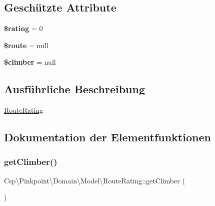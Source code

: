 \subsection*{Geschützte Attribute}
\begin{DoxyCompactItemize}
\item 
\mbox{\label{classCsp_1_1Pinkpoint_1_1Domain_1_1Model_1_1RouteRating_a0f692a13c1bb248af461abf897391aff}} 
{\bfseries \$rating} = 0
\item 
\mbox{\label{classCsp_1_1Pinkpoint_1_1Domain_1_1Model_1_1RouteRating_ae922a14157d205d824ad88dba43e33d6}} 
{\bfseries \$route} = null
\item 
\mbox{\label{classCsp_1_1Pinkpoint_1_1Domain_1_1Model_1_1RouteRating_a5b3ce5ca31fa832263351d0b12dc0df6}} 
{\bfseries \$climber} = null
\end{DoxyCompactItemize}


\subsection{Ausführliche Beschreibung}
\hyperlink{classCsp_1_1Pinkpoint_1_1Domain_1_1Model_1_1RouteRating}{Route\+Rating} 

\subsection{Dokumentation der Elementfunktionen}
\mbox{\label{classCsp_1_1Pinkpoint_1_1Domain_1_1Model_1_1RouteRating_aaeb32ee683b7bb69496fe4da05a7c13f}} 
\subsubsection{\texorpdfstring{get\+Climber()}{getClimber()}}
{\footnotesize\ttfamily Csp\textbackslash{}\+Pinkpoint\textbackslash{}\+Domain\textbackslash{}\+Model\textbackslash{}\+Route\+Rating\+::get\+Climber (\begin{DoxyParamCaption}{ }\end{DoxyParamCaption})}

